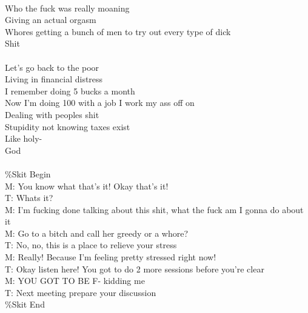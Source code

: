 \documentclass[12pt, b5paper, oneside]{book}
\begin{document}
\\Who the fuck was really moaning
\\Giving an actual orgasm
\\Whores getting a bunch of men to try out every type of dick
\\Shit
%
\\\\Let's go back to the poor
\\Living in financial distress
\\I remember doing 5 bucks a month
\\Now I'm doing 100 with a job I work my ass off on
\\Dealing with peoples shit
\\Stupidity not knowing taxes exist
\\Like holy-
\\God
%
\\\\\%Skit Begin
\\M: You know what that's it! Okay that's it!
\\T: Whats it?
\\M: I'm fucking done talking about this shit, what the fuck am I gonna do about it
\\M: Go to a bitch and call her greedy or a whore?
\\T: No, no, this is a place to relieve your stress
\\M: Really! Because I'm feeling pretty stressed right now!
\\T: Okay listen here! You got to do 2 more sessions before you're clear
\\M: YOU GOT TO BE F- kidding me 
\\T: Next meeting prepare your discussion
\\\%Skit End 
\newpage
\end{document}
